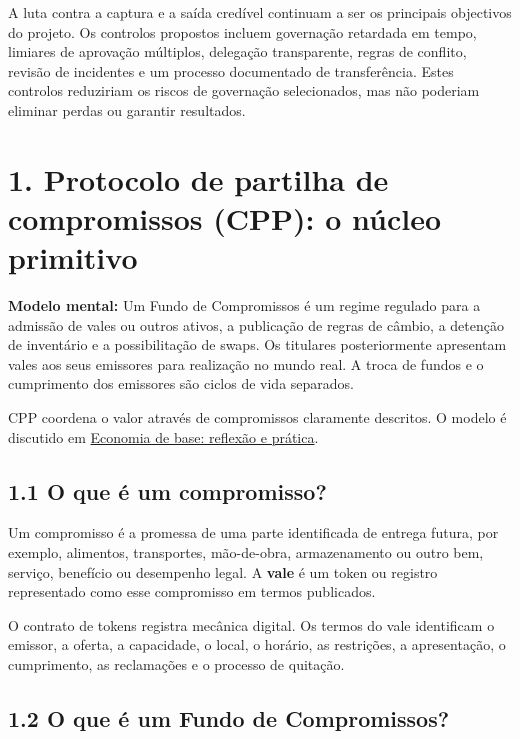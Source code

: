 \documentclass[11pt]{article}
\begin{document}
A luta contra a captura e a saída credível continuam a ser os principais objectivos do projeto. Os controlos propostos incluem governação retardada em tempo, limiares de aprovação múltiplos, delegação transparente, regras de conflito, revisão de incidentes e um processo documentado de transferência. Estes controlos reduziriam os riscos de governação selecionados, mas não poderiam eliminar perdas ou garantir resultados.


\section*{1. Protocolo de partilha de compromissos (CPP): o núcleo primitivo}

\textbf{Modelo mental:} Um Fundo de Compromissos é um regime regulado para a admissão de vales ou outros ativos, a publicação de regras de câmbio, a detenção de inventário e a possibilitação de swaps. Os titulares posteriormente apresentam vales aos seus emissores para realização no mundo real. A troca de fundos e o cumprimento dos emissores são ciclos de vida separados.

CPP coordena o valor através de compromissos claramente descritos. O modelo é discutido em \href{https://willruddick.substack.com/p/grassroots-economics-the-book-is}{Economia de base: reflexão e prática}.

\subsection*{1.1 O que é um compromisso?}

Um compromisso é a promessa de uma parte identificada de entrega futura, por exemplo, alimentos, transportes, mão-de-obra, armazenamento ou outro bem, serviço, benefício ou desempenho legal. A \textbf{vale} é um token ou registro representado como esse compromisso em termos publicados.

O contrato de tokens registra mecânica digital. Os termos do vale identificam o emissor, a oferta, a capacidade, o local, o horário, as restrições, a apresentação, o cumprimento, as reclamações e o processo de quitação.

\subsection*{1.2 O que é um Fundo de Compromissos?}
\end{document}
